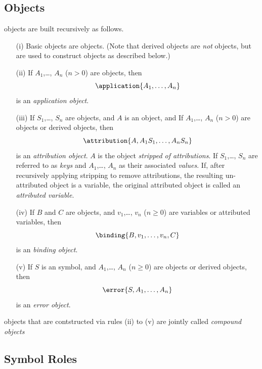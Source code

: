\subsection{\OM Objects}\label{sec_compound}
  
\OM objects are built recursively as follows.
\begin{itemize}
\item[(i)] Basic \OM objects are \OM objects.
(Note that derived \OM objects are
\emph{not} \OM objects, but are used to construct \OM
objects as described below.)
\item[(ii)] If $A_1$,\ldots, $A_n$ ($n>0$) are \OM objects, then
  \[\application{A_1,\ldots,A_n}\]
  is an \OM \emph{application object}.
\item[(iii)] If $S_1$,\ldots, $S_n$ are \OM objects, and $A$ is an \OM object, and If
  $A_1$,\ldots, $A_n$ ($n>0$) are \OM objects or \OM derived objects, then
  \[\attribution{A, A_1 S_1,\ldots,A_n S_n}\]
  is an \OM \emph{attribution object}. $A$ is the object \emph{stripped of attributions}.
  If $S_1$,\ldots, $S_n$ are referred to as \emph{keys} and $A_1$,\ldots, $A_n$ as their
  associated \emph{values}.  If, after recursively applying stripping to remove
  attributions, the resulting un-attributed object is a variable, the original attributed
  object is called an \emph{attributed variable}.

\item[(iv)] If $B$ and $C$ are \OM objects, and $v_1$,\ldots, $v_n$ ($n\geq 0$) are \OM variables or attributed
  variables, then
  \[\binding{B, v_1,\ldots,v_n, C}\]
  is an \OM \emph{binding object}.

\item[(v)]  If $S$ is an \OM symbol, and $A_1$,\ldots, $A_n$ ($n\geq 0$) are \OM objects or
\OM derived objects, then
  \[\error{S, A_1,\ldots,A_n}\]
  is an \OM \emph{error object}.
\end{itemize}
\OM objects that are contstructed via rules (ii) to (v) are jointly called \emph{compound
  \OM objects}
\subsection{\OM Symbol Roles}\label{sec_roles}


